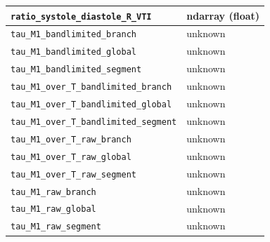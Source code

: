 \documentclass[11pt]{article}
\begin{document}
\begin{longtable}{|p{}|p{}|}
\texttt{ratio\_\allowbreak{}systole\_\allowbreak{}diastole\_\allowbreak{}R\_\allowbreak{}VTI} & ndarray (float) \\ \hline
\texttt{tau\_\allowbreak{}M1\_\allowbreak{}bandlimited\_\allowbreak{}branch} & unknown \\ \hline
\texttt{tau\_\allowbreak{}M1\_\allowbreak{}bandlimited\_\allowbreak{}global} & unknown \\ \hline
\texttt{tau\_\allowbreak{}M1\_\allowbreak{}bandlimited\_\allowbreak{}segment} & unknown \\ \hline
\texttt{tau\_\allowbreak{}M1\_\allowbreak{}over\_\allowbreak{}T\_\allowbreak{}bandlimited\_\allowbreak{}branch} & unknown \\ \hline
\texttt{tau\_\allowbreak{}M1\_\allowbreak{}over\_\allowbreak{}T\_\allowbreak{}bandlimited\_\allowbreak{}global} & unknown \\ \hline
\texttt{tau\_\allowbreak{}M1\_\allowbreak{}over\_\allowbreak{}T\_\allowbreak{}bandlimited\_\allowbreak{}segment} & unknown \\ \hline
\texttt{tau\_\allowbreak{}M1\_\allowbreak{}over\_\allowbreak{}T\_\allowbreak{}raw\_\allowbreak{}branch} & unknown \\ \hline
\texttt{tau\_\allowbreak{}M1\_\allowbreak{}over\_\allowbreak{}T\_\allowbreak{}raw\_\allowbreak{}global} & unknown \\ \hline
\texttt{tau\_\allowbreak{}M1\_\allowbreak{}over\_\allowbreak{}T\_\allowbreak{}raw\_\allowbreak{}segment} & unknown \\ \hline
\texttt{tau\_\allowbreak{}M1\_\allowbreak{}raw\_\allowbreak{}branch} & unknown \\ \hline
\texttt{tau\_\allowbreak{}M1\_\allowbreak{}raw\_\allowbreak{}global} & unknown \\ \hline
\texttt{tau\_\allowbreak{}M1\_\allowbreak{}raw\_\allowbreak{}segment} & unknown \\ \hline
\end{longtable}
\end{document}
